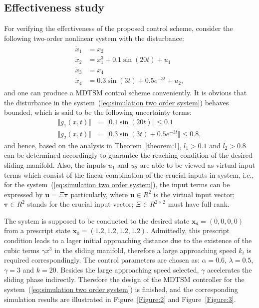 \documentclass[3p]{elsarticle}
\theoremstyle{plain}
\theoremstyle{remark}
\begin{document}
\subsection{Effectiveness study}
For verifying the effectiveness of the proposed control scheme, consider the following two-order nonlinear system with the disturbance:
\begin{align}
\begin{split}
\dot x_1 &= x_2\\
\dot x_2 &= x_1^3+0.1\sin(20t)+u_1\\
\dot x_3 &= x_4\\
\dot x_4 &= 0.3\sin(3t)+0.5e^{-3t}+u_2,\label{eq:simulation two order system}
\end{split}
\end{align}
and one can produce a MDTSM control scheme conveniently. It is obvious that the disturbance in the system~(\ref{eq:simulation two order system}) behaves bounded, which is said to be the following uncertainty terms:
\begin{align*}
\Vert g_1(x,t)\Vert &= \Vert 0.1\sin(20t)\Vert\le 0.1\\
\Vert g_2(x,t)\Vert &= \Vert 0.3\sin(3t)+0.5e^{-3t}\Vert\le 0.8,
\end{align*}
and hence, based on the analysis in Theorem~\ref{theorem:1}, $l_1>0.1$ and $l_2>0.8$ can be determined accordingly to guarantee the reaching condition of the desired sliding manifold. Also, the inputs $u_1$ and $u_2$ are able to be viewed as virtual input terms which consist of the linear combination of the crucial inputs in system, i.e., for the system~(\ref{eq:simulation two order system}), the input terms can be expressed by $\bm u = \Xi\bm\tau$ particularly, where $\bm u\in R^2$ is the virtual input vector; $\bm \tau\in R^2$ stands for the crucial input vector; $\Xi\in R^{2\times 2}$ must have full rank.\par
The system is supposed to be conducted to the desired state $\bm x_d=(0,0,0,0)$ from a prescript state $\bm x_0=(1.2,1.2,1.2,1.2)$. Admittedly, this prescript condition leads to a lager initial approaching distance due to the existence of the cubic terms $\gamma x^3$ in the sliding manifold, therefore a large approaching speed $k_i$ is required correspondingly. The control parameters are chosen as: $\alpha = 0.6$, $\lambda = 0.5$, $\gamma = 3$ and $k = 20$. Besides the large approaching speed selected, $\gamma$ accelerates the sliding phase indirectly. Therefore the design of the MDTSM controller for the system~(\ref{eq:simulation two order system}) is finished, and the corresponding simulation results are illustrated in Figure~\ref{Figure:2} and Figure~\ref{Figure:3}.\par
\end{document}
